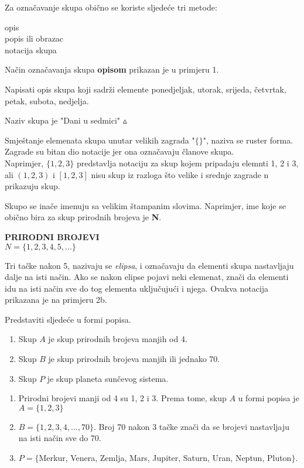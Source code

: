\documentclass[a4paper,14pt,svgnames]{article}
\newcounter{counter}
\newcommand{\examplecounter}{\textbf{\refstepcounter{counter}PRIMJER \thecounter}}
\newcommand{\example}[3]{\begin{tcolorbox}[title=\large \examplecounter \hfill\small\textbf{"#1"}]
#2
\begin{tcolorbox}[title=\small \textbf{RJEŠENJE},colback=white]
\begin{center}
#3
\hfill $\vartriangle$
\end{center}
\end{tcolorbox}
\end{tcolorbox}}
\begin{document}
Za označavanje skupa obično se koriste sljedeće tri metode:
\begin{center}
opis\\
popis ili obrazac\\
notacija skupa
\end{center}
Način označavanja skupa \textbf{opisom} prikazan je u primjeru 1.
\example{Opis skupova}{Napisati opis skupa koji sadrži elemente ponedjeljak, utorak, srijeda, četvrtak, petak, subota, nedjelja.}{Naziv skupa je "Dani u sedmici"}

Smještanje elemenata skupa unutar velikih zagrada "$\{ \}$", naziva se ruster forma. Zagrade su bitan dio notacije jer ona označavaju članove skupa.\\
Naprimjer, $\{1, 2, 3\}$ predstavlja notaciju za skup kojem pripadaju elemnti 1, 2 i 3, ali $(1, 2, 3)$ i $[1, 2, 3]$ nisu skup iz razloga što velike i srednje zagrade n prikazuju skup.

Skupo se inače imenuju sa velikim štampanim slovima. Naprimjer, ime koje se obično bira za skup prirodnih brojeva je \textbf{N}.\\
\begin{tcolorbox}
\begin{center}
\textbf{\textsc{PRIRODNI BROJEVI}}\\
$N = \{1, 2, 3, 4, 5, ... \}$
\end{center}
\end{tcolorbox}
Tri tačke nakon 5, nazivaju se \textit{elipsa}, i označavaju da elementi skupa nastavljaju dalje na isti način. Ako se nakon elipse pojavi neki elemenat, znači da elementi idu na isti način sve do tog elementa uključujući i njega. Ovakva notacija prikazana je na primjeru 2b.

\begin{tcolorbox}[title=\large \examplecounter\hfill\small\textbf{"Skup u formi popisa"}]
Predstaviti sljedeće u formi popisa.\begin{enumerate}[label=\alph*),leftmargin=0.5cm]
\item Skup $A$ je skup prirodnih brojeva manjih od 4.
\item Skup $B$ je skup prirodnih brojeva manjih ili jednako 70.
\item Skup $P$ je skup planeta sunčevog sistema.
\end{enumerate}
\begin{tcolorbox}[title=\small \textbf{RJEŠENJE},colback=white]
\begin{center}
\begin{enumerate}[label=\alph*),leftmargin=0.5cm]
\item Prirodni brojevi manji od 4 su 1, 2 i 3. Prema tome, skup $A$ u formi popisa je $A=\{1,2,3\}$
\item $B=\{1, 2, 3, 4, ... , 70\}$. Broj 70 nakon 3 tačke znači da se brojevi nastavljaju na isti način sve do 70.
\item $P=\{$Merkur, Venera, Zemlja, Mars, Jupiter, Saturn, Uran, Neptun, Pluton$\}$.
\end{enumerate}
\end{center}
\end{tcolorbox}
\end{tcolorbox}
\end{document}
